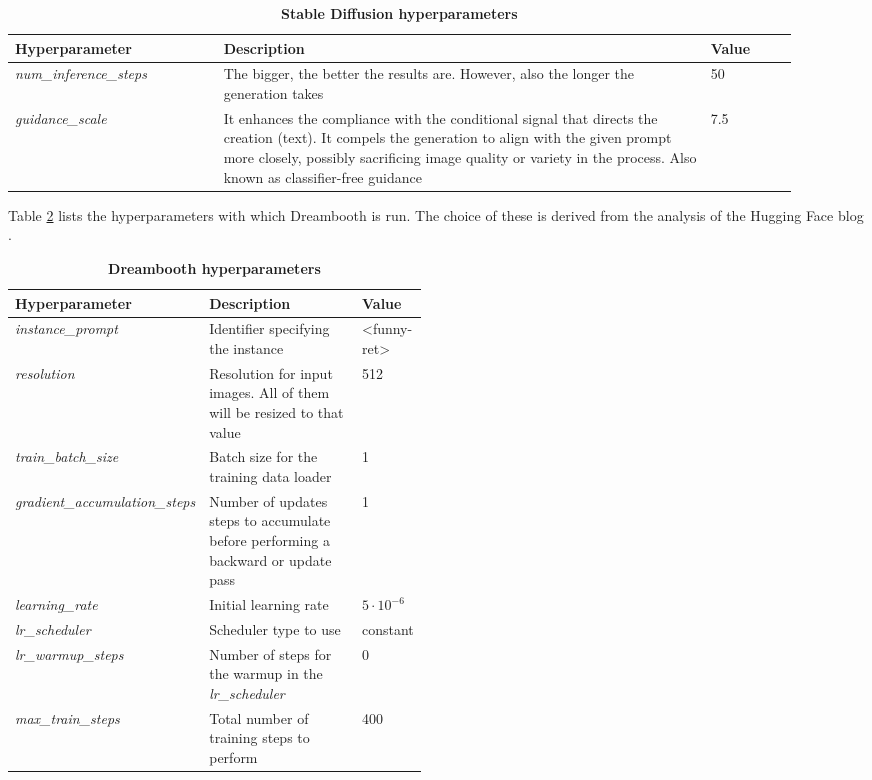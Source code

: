 \begin{table}[ht]
\centering
\begin{tabular}{|p{0.24\linewidth}|p{0.57\linewidth}|p{0.10\linewidth}|}
\hline
\rowcolor[HTML]{AEAAAA} 
\textbf{Hyperparameter} & \textbf{Description} & \textbf{Value} \\ \hline
\textit{num\_inference\_steps} & The bigger, the better the results are. However, also the longer the generation   takes & 50 \\ \hline
\textit{guidance\_scale} & It enhances the compliance with the conditional signal that directs the creation   (text). It compels the generation to align with the given prompt more closely, possibly sacrificing image quality or variety in the process. Also known as classifier-free guidance & 7.5 \\ \hline
\end{tabular}
\caption{\textbf{Stable Diffusion hyperparameters}}
\label{table:TableSDhyperparameters}
\end{table}

Table \ref{table:TableDreamboothhyperparameters} lists the hyperparameters with which Dreambooth is run. The choice of these is derived from the analysis of the Hugging Face blog \cite{dreamboothdiffusers}.

\begin{table}[ht]
\centering
\begin{tabular}{|l|p{0.48\linewidth}|l|}
\hline
\rowcolor[HTML]{AEAAAA} 
\textbf{Hyperparameter} & \textbf{Description} & \textbf{Value} \\ \hline
\textit{instance\_prompt} & Identifier specifying the instance & \textless{}funny-ret\textgreater{} \\ \hline
\textit{resolution} & Resolution for input images. All of them will be resized to that value & 512 \\ \hline
\textit{train\_batch\_size} & Batch   size for the training data loader & 1 \\ \hline
\textit{gradient\_accumulation\_steps} & Number   of updates steps to accumulate before performing a backward or update pass & 1 \\ \hline
\textit{learning\_rate} & Initial learning rate & $5\cdot10^{-6}$ \\ \hline
\textit{lr\_scheduler} & Scheduler type to use & constant \\ \hline
\textit{lr\_warmup\_steps} & Number of steps for the warmup in the \textit{lr\_scheduler} & 0 \\ \hline
\textit{max\_train\_steps} & Total number of training steps to perform & 400 \\ \hline
\end{tabular}
\caption{\textbf{Dreambooth hyperparameters}}
\label{table:TableDreamboothhyperparameters}
\end{table}

